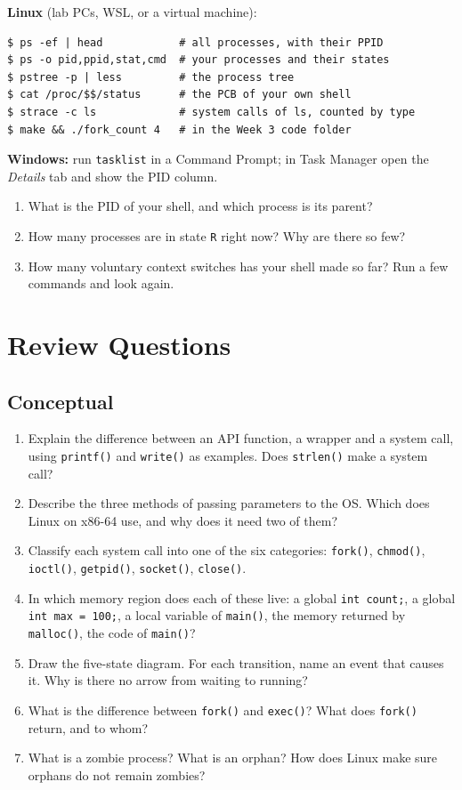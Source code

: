 \documentclass[11pt,a4paper]{article}
\newcommand{\cmd}[1]{\texttt{#1}}
\begin{document}
\begin{tryit}
\textbf{Linux} (lab PCs, WSL, or a virtual machine):
\begin{lstlisting}[style=term]
$ ps -ef | head            # all processes, with their PPID
$ ps -o pid,ppid,stat,cmd  # your processes and their states
$ pstree -p | less         # the process tree
$ cat /proc/$$/status      # the PCB of your own shell
$ strace -c ls             # system calls of ls, counted by type
$ make && ./fork_count 4   # in the Week 3 code folder
\end{lstlisting}
\textbf{Windows:} run \cmd{tasklist} in a Command Prompt; in Task Manager open the \emph{Details} tab and show the PID column.
\begin{enumerate}[leftmargin=1.4em]
  \item What is the PID of your shell, and which process is its parent?
  \item How many processes are in state \texttt{R} right now? Why are there so few?
  \item How many voluntary context switches has your shell made so far? Run a few commands and look again.
\end{enumerate}
\end{tryit}

\section{Review Questions}

\subsection*{Conceptual}
\begin{enumerate}[leftmargin=1.6em]
  \item Explain the difference between an API function, a wrapper and a system call, using \cmd{printf()} and \cmd{write()} as examples. Does \cmd{strlen()} make a system call?
  \item Describe the three methods of passing parameters to the OS. Which does Linux on x86-64 use, and why does it need two of them?
  \item Classify each system call into one of the six categories: \cmd{fork()}, \cmd{chmod()}, \cmd{ioctl()}, \cmd{getpid()}, \cmd{socket()}, \cmd{close()}.
  \item In which memory region does each of these live: a global \texttt{int count;}, a global \texttt{int max = 100;}, a local variable of \cmd{main()}, the memory returned by \cmd{malloc()}, the code of \cmd{main()}?
  \item Draw the five-state diagram. For each transition, name an event that causes it. Why is there no arrow from waiting to running?
  \item What is the difference between \cmd{fork()} and \cmd{exec()}? What does \cmd{fork()} return, and to whom?
  \item What is a zombie process? What is an orphan? How does Linux make sure orphans do not remain zombies?
\end{enumerate}
\end{document}
